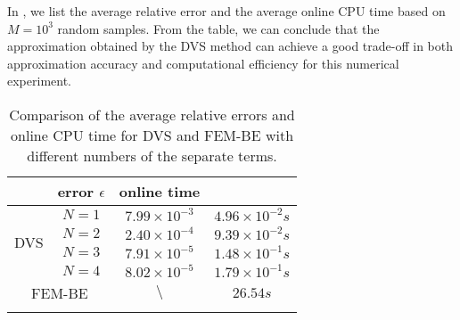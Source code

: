 \documentclass[10pt,a4paper]{article}
\numberwithin{equation}{section}
\numberwithin{lemma}{section}
\numberwithin{example}{section}
\numberwithin{definition}{section}
\numberwithin{assumption}{section}
\numberwithin{theorem}{section}
\numberwithin{proposition}{section}
\numberwithin{corollary}{section}
\numberwithin{remark}{section}
\begin{document}
In , we list the average relative error and the average online CPU time based on $M=10^3$ random samples.
From the table, we can conclude that the approximation obtained by the DVS method can achieve a good trade-off in both approximation accuracy and computational efficiency for this numerical experiment.
\begin{table}[hbtp]
\centering
\caption{Comparison of the average relative errors and online CPU time for DVS and FEM-BE with different numbers of the separate terms.}
\vspace*{2pt}
\scriptsize
\begin{tabular}{cc|c|c}
\Xhline{1pt}			
\multicolumn{2}{c|}{\multirow{2}{*}\centering Algorithm}
&
\multicolumn{1}{c|}{\centering error $\epsilon$ }
&
\multicolumn{1}{c}{\centering online time}\\
\hline
\multirow{4}{*}{DVS}  & $N=1$  &   $7.99 \times10^{-3} $   &  $4.96 \times10^{-2}s$   \\
\cline{3-4}
                     & $N=2$    & $2.40 \times10^{-4} $   &  $9.39 \times10^{-2}s$  \\
\cline{3-4}
                     & $N=3$    & $7.91 \times10^{-5} $   &  $1.48 \times10^{-1}s$ \\
\cline{3-4}
                     & $N=4$    &   $8.02 \times10^{-5} $   &  $1.79 \times10^{-1}s$  \\
\hline
\multicolumn{2}{c|}{\centering FEM-BE} & $\setminus $ &  $26.54s$\\
\Xhline{1pt}
\end{tabular}
\label{table_AC}
\end{table}
	


  



  
\end{document}
